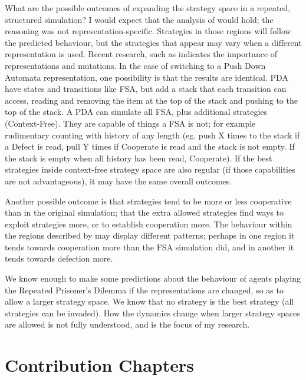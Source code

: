 \documentclass[a4paper,11pt,bcshonoursthesis,singlespace,twoside]{cssethesis}
\begin{document}
What are the possible outcomes of expanding the strategy space in a repeated, structured simulation? 
I would expect that the analysis of \citet{van-veelen:PNAS:2012} would hold; the reasoning was not representation-specific. 
Strategies in those regions will follow the predicted behaviour, but the strategies that appear may vary when a different representation is used. 
Recent research, such as \citet{garcia:PLoSOne:2012} indicates the importance of representations and mutations. 
In the case of switching to a Push Down Automata representation, one possibility is that the results are identical. 
PDA have states and transitions like FSA, but add a stack that each transition can access, reading and removing the item at the top of the stack and pushing to the top of the stack. 
A PDA can simulate all FSA, plus additional strategies (Context-Free)\citep{Sipser2006}.  
They are capable of things a FSA is not; for example rudimentary counting with history of any length (eg. push X times to the stack if a Defect is read, pull Y times if Cooperate is read and the stack is not empty. If the stack is empty when all history has been read, Cooperate). If the best strategies inside context-free strategy space are also regular (if those capabilities are not advantageous), it may have the same overall outcomes.  

Another possible outcome is that strategies tend to be more or less cooperative than in the original simulation; that the extra allowed strategies find ways to exploit strategies more, or to establish cooperation more. 
The behaviour within the regions described by \citet{van-veelen:PNAS:2012} may display different patterns; perhaps in one region it tends towards cooperation more than the FSA simulation did, and in another it tends towards defection more. 

We know enough to make some predictions about the behaviour of agents playing the Repeated Prisoner's Dilemma if the representations are changed, so as to allow a larger strategy space. 
We know that no strategy is the best strategy (all strategies can be invaded). 
How the dynamics change when larger strategy spaces are allowed is not fully understood, and is the focus of my research.
\chapter{Contribution Chapters}
\end{document}
